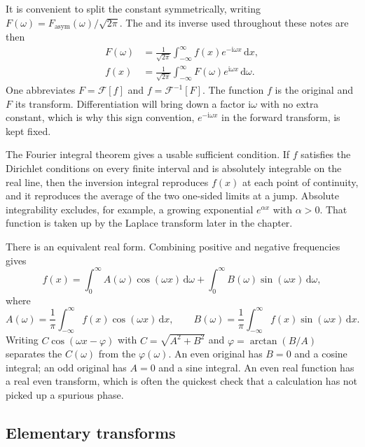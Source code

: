It is convenient to split the constant symmetrically, writing $F(\omega)=F_{\mathrm{asym}}(\omega)/\sqrt{2\pi}$. The  and its inverse used throughout these notes are then
\begin{align}
F(\omega)&=\frac{1}{\sqrt{2\pi}}\int_{-\infty}^{\infty}f(x)e^{-\mathrm{i}\omega x}\,\mathrm{d}x,
\label{eq:ch06-ft}\\
f(x)&=\frac{1}{\sqrt{2\pi}}\int_{-\infty}^{\infty}F(\omega)e^{\mathrm{i}\omega x}\,\mathrm{d}\omega.
\label{eq:ch06-ift}
\end{align}
One abbreviates $F=\mathcal{F}[f]$ and $f=\mathcal{F}^{-1}[F]$. The function $f$ is the original and $F$ its transform. Differentiation will bring down a factor $\mathrm{i}\omega$ with no extra constant, which is why this sign convention, $e^{-\mathrm{i}\omega x}$ in the forward transform, is kept fixed.

The Fourier integral theorem gives a usable sufficient condition. If $f$ satisfies the Dirichlet conditions on every finite interval and is absolutely integrable on the real line, then the inversion integral reproduces $f(x)$ at each point of continuity, and it reproduces the average of the two one-sided limits at a jump. Absolute integrability excludes, for example, a growing exponential $e^{\alpha x}$ with $\alpha>0$. That function is taken up by the Laplace transform later in the chapter.

There is an equivalent real form. Combining positive and negative frequencies gives
\begin{equation}
f(x)=\int_0^{\infty}A(\omega)\cos(\omega x)\,\mathrm{d}\omega
+\int_0^{\infty}B(\omega)\sin(\omega x)\,\mathrm{d}\omega,
\end{equation}
where
\begin{equation}
A(\omega)=\frac{1}{\pi}\int_{-\infty}^{\infty}f(x)\cos(\omega x)\,\mathrm{d}x,
\qquad
B(\omega)=\frac{1}{\pi}\int_{-\infty}^{\infty}f(x)\sin(\omega x)\,\mathrm{d}x.
\end{equation}
Writing $C\cos(\omega x-\varphi)$ with $C=\sqrt{A^2+B^2}$ and $\varphi=\arctan(B/A)$ separates the  $C(\omega)$ from the  $\varphi(\omega)$. An even original has $B=0$ and a cosine integral; an odd original has $A=0$ and a sine integral. An even real function has a real even transform, which is often the quickest check that a calculation has not picked up a spurious phase.

\subsection{Elementary transforms}

